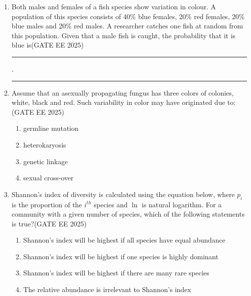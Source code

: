 \begin{enumerate}[leftmargin=*,label=\textbf{Q.\arabic*},resume]
\begin{multicols}{2}
\begin{enumerate}
\item In the absence of caterpillars, ants negatively affected plant performance
\item In the absence of ants, caterpillars positively affected plant performance
\item In the presence of caterpillars, ants negatively affected plant performance
\item In the presence of ants, caterpillars positively affected plant performance
\end{enumerate}
\end{multicols}

\item Both males and females of a fish species show variation in colour. A population of this species consists of 40\% blue females, 20\% red females, 20\% blue males and 20\% red males. A researcher catches one fish at random from this population. Given that a male fish is caught, the probability that it is blue is\hfill {(GATE EE 2025)} \rule{4cm}{0.15mm}.

\rule{4cm}{0.15mm}

\item Assume that an asexually propagating fungus has three colors of colonies, white, black and red. Such variability in color may have originated due to:\hfill {(GATE EE 2025)}
\begin{multicols}{2}
\begin{enumerate}
\item germline mutation
\item heterokaryosis
\item genetic linkage
\item sexual cross-over
\end{enumerate}
\end{multicols}

\item Shannon's index of diversity is calculated using the equation below, where $p_i$ is the proportion of the $i^{th}$ species and $\ln$ is natural logarithm. For a community with a given number of species, which of the following statements is true?\hfill {(GATE EE 2025)}
\begin{multicols}{2}
\begin{enumerate}
\item Shannon's index will be highest if all species have equal abundance
\item Shannon's index will be highest if one species is highly dominant
\item Shannon's index will be highest if there are many rare species
\item The relative abundance is irrelevant to Shannon's index
\end{enumerate}
\end{multicols}


\end{enumerate}
